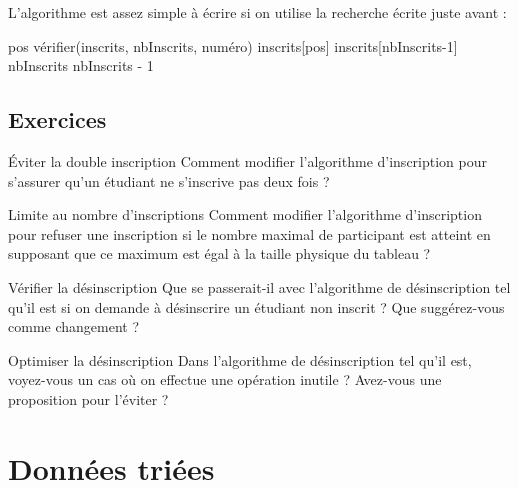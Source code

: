 			L'algorithme est assez simple à écrire
			si on utilise la recherche écrite juste avant :
			
			\begin{LDA}
					\Let pos \Gets vérifier(inscrits, nbInscrits, numéro)
					\Let inscrits[pos] \Gets inscrits[nbInscrits-1]
					\Let nbInscrits \Gets nbInscrits - 1					
				\EndAlgo
			\end{LDA}
			
		\subsection{Exercices}
			
			\begin{Exercice}{Éviter la double inscription}
				Comment modifier l'algorithme d'inscription
				pour s'assurer qu'un étudiant ne s'inscrive pas deux fois ?
			\end{Exercice}

			\begin{Exercice}{Limite au nombre d'inscriptions}
				Comment modifier l'algorithme d'inscription
				pour refuser une inscription si le nombre maximal
				de participant est atteint
				en supposant que ce maximum est égal à la taille physique du tableau ?
			\end{Exercice}

			\begin{Exercice}{Vérifier la désinscription}
				Que se passerait-il avec l'algorithme
				de désinscription tel qu'il est
				si on demande à désinscrire un étudiant non inscrit ?
				Que suggérez-vous comme changement ?
			\end{Exercice}

			\begin{Exercice}{Optimiser la désinscription}
				Dans l'algorithme de désinscription tel qu'il est,
				voyez-vous un cas où on effectue une opération inutile ?
				Avez-vous une proposition pour l'éviter ?
			\end{Exercice}

	\section{Données triées} 

